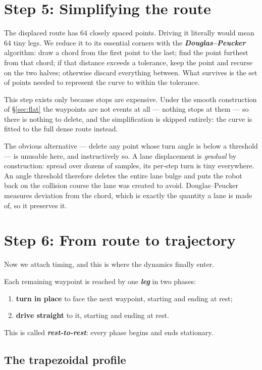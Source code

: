 \documentclass[11pt,a4paper]{article}
\newcommand{\defn}[1]{\textbf{\textit{#1}}}
\begin{document}
\section{Step 5: Simplifying the route}
\label{sec:simplify}

The displaced route has $64$ closely spaced points. Driving it literally would mean $64$
tiny legs. We reduce it to its essential corners with the \defn{Douglas--Peucker}
algorithm: draw a chord from the first point to the last; find the point furthest from that
chord; if that distance exceeds a tolerance, keep the point and recurse on the two halves;
otherwise discard everything between. What survives is the set of points needed to represent
the curve to within the tolerance.

This step exists only because stops are expensive. Under the smooth construction of
\S\ref{sec:flat} the waypoints are not events at all --- nothing stops at them --- so there
is nothing to delete, and the simplification is skipped entirely: the curve is fitted to
the full dense route instead.

The obvious alternative --- delete any point whose turn angle is below a threshold --- is
unusable here, and instructively so. A lane displacement is \emph{gradual} by construction:
spread over dozens of samples, its per-step turn is tiny everywhere. An angle threshold
therefore deletes the entire lane bulge and puts the robot back on the collision course the
lane was created to avoid. Douglas--Peucker measures deviation from the chord, which is
exactly the quantity a lane is made of, so it preserves it.

\section{Step 6: From route to trajectory}
\label{sec:legs}

Now we attach timing, and this is where the dynamics finally enter.

Each remaining waypoint is reached by one \defn{leg} in two phases:
\begin{enumerate}[nosep]
\item \textbf{turn in place} to face the next waypoint, starting and ending at rest;
\item \textbf{drive straight} to it, starting and ending at rest.
\end{enumerate}
This is called \defn{rest-to-rest}: every phase begins and ends stationary.

\subsection{The trapezoidal profile}
\end{document}
